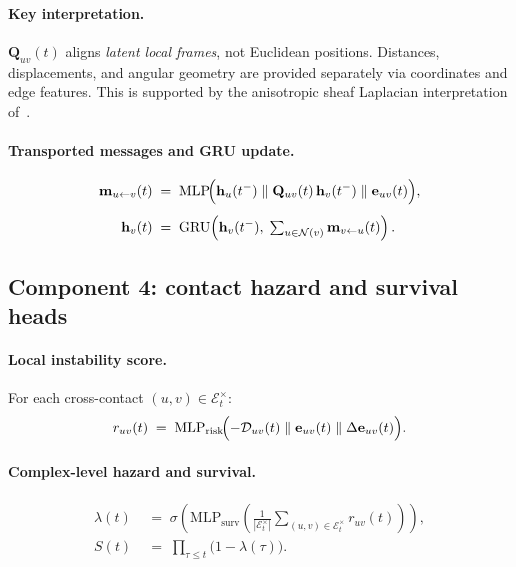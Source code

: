 \documentclass[12pt,a4paper]{article}
\begin{document}
\paragraph{Key interpretation.}
$\mathbf{Q}_{uv}(t)$ aligns \emph{latent local frames}, not Euclidean
positions.
Distances, displacements, and angular geometry are provided separately
via coordinates and edge features.
This is supported by the anisotropic sheaf Laplacian interpretation
of~\citet{physicsinformedsheaf2025}.

\paragraph{Transported messages and GRU update.}
\begin{align}
  \mathbf{m}_{u\leftarrow v}(t)
  &\;=\;
  \mathrm{MLP}\!\Bigl(
    \mathbf{h}_u(t^-)\;\Vert\;
    \mathbf{Q}_{uv}(t)\,\mathbf{h}_v(t^-)\;\Vert\;
    \mathbf{e}_{uv}(t)
  \Bigr),
  \label{eq:msg}\\[4pt]
  \mathbf{h}_v(t)
  &\;=\;
  \mathrm{GRU}\!\left(
    \mathbf{h}_v(t^-),\;
    \textstyle\sum_{u\in\mathcal{N}(v)}\mathbf{m}_{v\leftarrow u}(t)
  \right).
  \label{eq:gru}
\end{align}

\subsection{Component 4: contact hazard and survival heads}
\label{sec:heads}

\paragraph{Local instability score.}
For each cross-contact $(u,v)\in\mathcal{E}^{\times}_t$:
\begin{equation}
  r_{uv}(t)
  \;=\;
  \mathrm{MLP}_{\mathrm{risk}}\!\Bigl(
    {-\mathcal{D}_{uv}(t)}\;\Vert\;
    \mathbf{e}_{uv}(t)\;\Vert\;
    \Delta\mathbf{e}_{uv}(t)
  \Bigr).
  \label{eq:risk}
\end{equation}

\paragraph{Complex-level hazard and survival.}
\begin{align}
  \lambda(t)
  &\;=\;
  \sigma\!\left(
    \mathrm{MLP}_{\mathrm{surv}}\!\!\left(
      \frac{1}{|\mathcal{E}^{\times}_t|}
      \sum_{(u,v)\in\mathcal{E}^{\times}_t} r_{uv}(t)
    \right)
  \right),
  \label{eq:hazard}\\[4pt]
  S(t)
  &\;=\;
  \prod_{\tau\le t}\bigl(1-\lambda(\tau)\bigr).
  \label{eq:survival}
\end{align}
\end{document}
